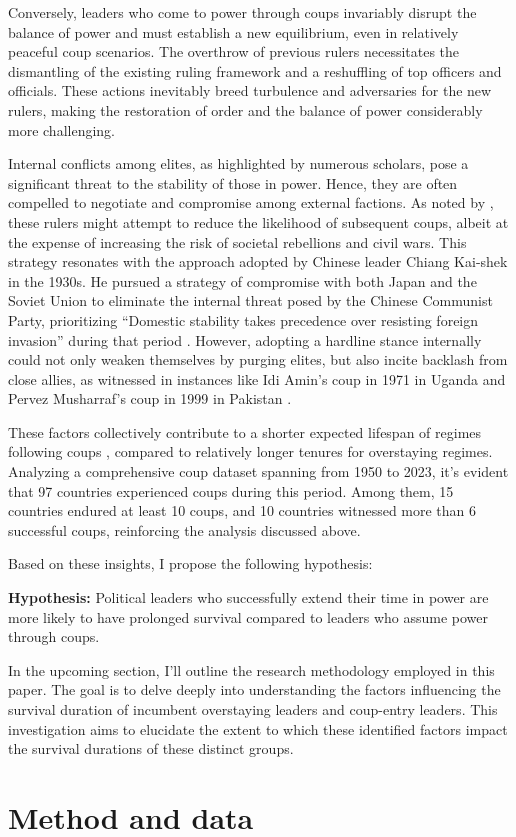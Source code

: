 \documentclass[
  12pt,
  a4paper,
  12pt]{article}
\begin{document}
Conversely, leaders who come to power through coups invariably disrupt
the balance of power and must establish a new equilibrium, even in
relatively peaceful coup scenarios. The overthrow of previous rulers
necessitates the dismantling of the existing ruling framework and a
reshuffling of top officers and officials. These actions inevitably
breed turbulence and adversaries for the new rulers, making the
restoration of order and the balance of power considerably more
challenging.

Internal conflicts among elites, as highlighted by numerous scholars,
pose a significant threat to the stability of those in power. Hence,
they are often compelled to negotiate and compromise among external
factions. As noted by \citet{roessler2011}, these rulers might attempt
to reduce the likelihood of subsequent coups, albeit at the expense of
increasing the risk of societal rebellions and civil wars. This strategy
resonates with the approach adopted by Chinese leader Chiang Kai-shek in
the 1930s. He pursued a strategy of compromise with both Japan and the
Soviet Union to eliminate the internal threat posed by the Chinese
Communist Party, prioritizing ``Domestic stability takes precedence over
resisting foreign invasion'' during that period \citep{chu1999chiang}.
However, adopting a hardline stance internally could not only weaken
themselves by purging elites, but also incite backlash from close
allies, as witnessed in instances like Idi Amin's coup in 1971 in Uganda
and Pervez Musharraf's coup in 1999 in Pakistan \citep{sudduth2017a}.

These factors collectively contribute to a shorter expected lifespan of
regimes following coups \citep{dahl2023}, compared to relatively longer
tenures for overstaying regimes. Analyzing a comprehensive coup dataset
\citep{powell2011} spanning from 1950 to 2023, it's evident that 97
countries experienced coups during this period. Among them, 15 countries
endured at least 10 coups, and 10 countries witnessed more than 6
successful coups, reinforcing the analysis discussed above.

Based on these insights, I propose the following hypothesis:

\textbf{Hypothesis:} Political leaders who successfully extend their
time in power are more likely to have prolonged survival compared to
leaders who assume power through coups.

In the upcoming section, I'll outline the research methodology employed
in this paper. The goal is to delve deeply into understanding the
factors influencing the survival duration of incumbent overstaying
leaders and coup-entry leaders. This investigation aims to elucidate the
extent to which these identified factors impact the survival durations
of these distinct groups.

\hypertarget{method-and-data}{%
\section{Method and data}\label{method-and-data}}

\newpage


\renewcommand\refname{References}
  
\end{document}
